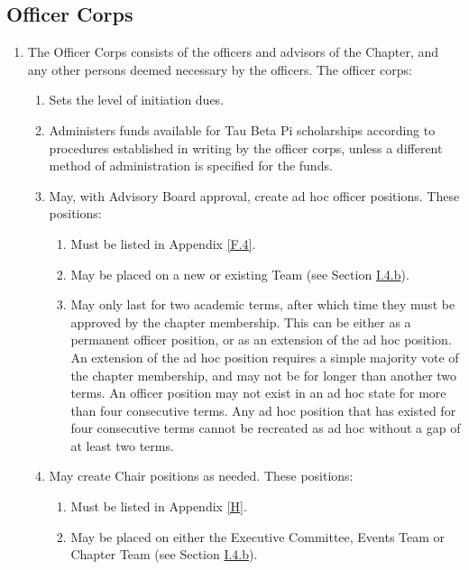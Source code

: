 \subsection{Officer Corps} \label{I.4}

\begin{enumerate}
    \item {}
    The Officer Corps consists of the officers and
advisors of the Chapter, and any other persons deemed necessary by the officers. The
officer corps:
    \begin{enumerate}
        \item {}
        Sets the level of initiation dues.
        \item {}
        Administers funds available for Tau Beta Pi scholarships according to procedures
established in writing by the officer corps, unless a different method of
administration is specified for the funds.
        \item {}
        May, with Advisory Board approval, create ad hoc officer positions. These positions:
        \begin{enumerate}
            \item Must be listed in Appendix \ref{F.4}.
            \item May be placed on a new or existing Team (see Section \hyperref[I.4.b]{I.4.b}).
            \item May only last for two academic terms, after which time they must be approved
by the chapter membership. This can be either as a permanent officer
position, or as an extension of the ad hoc position. An extension of the
ad hoc position requires a simple majority vote of the chapter membership,
and may not be for longer than another two terms. An officer position may
not exist in an ad hoc state for more than four consecutive terms. Any ad
hoc position that has existed for four consecutive terms cannot be recreated
as ad hoc without a gap of at least two terms.
        \end{enumerate}
        \item {}
        May create Chair positions as needed. These positions:
        \begin{enumerate}
            \item Must be listed in Appendix \ref{H}.
            \item May be placed on either the Executive Committee, Events Team or Chapter Team (see Section \hyperref[I.4.b]{I.4.b}).

\end{enumerate}
\end{enumerate}
\end{enumerate}
